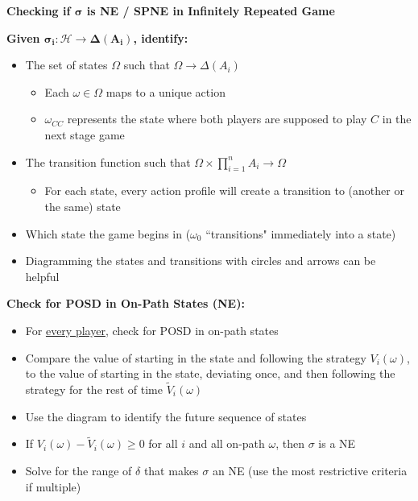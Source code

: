 \documentclass{report}
\newcommand{\FlowerSmall}{\mbox{\raisebox{-1pt}{\small\EightFlowerPetalRemoved}}} %
\begin{document}
\begin{mdframed}
	\medskip
	\begin{center} \textbf{{\large Checking if $\boldsymbol{\sigma}$ is NE / SPNE in Infinitely Repeated Game}} \end{center} \bigskip
	\textbf{Given $\boldsymbol{\sigma_i: \mathcal{H} \rightarrow \Delta (A_i)}$, identify:}
	\begin{itemize}[label=\FlowerSmall]		
		\item The set of states $\Omega$ such that $\Omega \rightarrow \Delta (A_i)$ \hspace{10pt}
			\begin{itemize}
				\item Each $\omega \in \Omega$ maps to a unique action
				\item $\omega_{CC}$ represents the state where both players are supposed to play $C$ in the next stage game
			\end{itemize}
		\item The transition function such that $\Omega \times \prod_{i=1}^n A_i \rightarrow \Omega$
			\begin{itemize}
				\item For each state, every action profile will create a transition to (another or the same) state
			\end{itemize}
		\item Which state the game begins in ($\omega_0$ ``transitions" immediately into a state)
		\item Diagramming the states and transitions with circles and arrows can be helpful
	\end{itemize} \bigskip
	\textbf{Check for POSD in On-Path States (NE):}
		\begin{itemize}
			\item For \underline{every player}, check for POSD in on-path states
			\item Compare the value of starting in the state and following the strategy $V_i(\omega)$, to the value of starting in the state, deviating once, and then following the strategy for the rest of time $\widetilde{V}_i(\omega)$
			\item Use the diagram to identify the future sequence of states
			\item If $V_i(\omega) - \widetilde{V}_i(\omega) \geq 0$ for all $i$ and all on-path $\omega$, then $\sigma$ is a NE
			\item Solve for the range of $\delta$ that makes $\sigma$ an NE (use the most restrictive criteria if multiple)

\end{itemize}
\end{mdframed}
\end{document}
